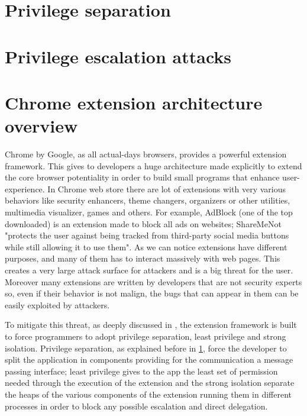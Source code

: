 \section{Privilege separation}
\label{sec:PriviSep}


\section{Privilege escalation attacks}
\label{sec:Escalation}

\section{Chrome extension architecture overview}
\label{sec:ExtOverview}
Chrome by Google, as all actual-days browsers, provides a powerful extension framework. This gives to developers a huge architecture made explicitly to extend the core browser potentiality in order to build small programs that enhance user-experience. In Chrome web store there are lot of extensions with very various behaviors like security enhancers, theme changers, organizers or other utilities, multimedia visualizer, games and others. For example, AdBlock (one of the top downloaded) is an extension made to block all ads on websites; ShareMeNot "protects the user against being tracked from third-party social media buttons while still allowing it to use them"\cite{ShareMeNot}. As we can notice extensions have different purposes, and many of them has to interact massively with web pages. This creates a very large attack surface for attackers and is a big threat for the user. Moreover many extensions are written by developers that are not security experts so, even if their behavior is not malign, the bugs that can appear in them can be easily exploited by attackers.

To mitigate this threat, as deeply discussed in \cite{ChromeExtSpec}, the extension framework is built to force programmers to adopt privilege separation, least privilege and strong isolation. Privilege separation, as explained before in \ref{sec:PriviSep}, force the developer to split the application in components providing for the communication a message passing interface; least privilege gives to the app the least set of permission needed through the execution of the extension and the strong isolation separate the heaps of the various components of the extension running them in different processes in order to block any possible escalation and direct delegation.

